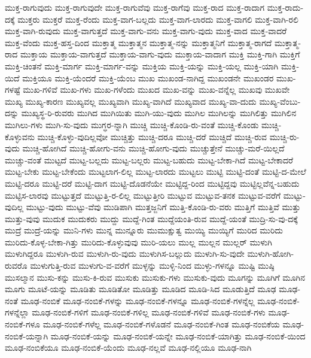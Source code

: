 {ಮುಕ್ತ-ರಾಗುವುದು
ಮುಕ್ತ-ರಾಗುವುದೇ
ಮುಕ್ತ-ರಾಗುವೆವು
ಮುಕ್ತ-ರಾಗೆವು
ಮುಕ್ತ-ರಾದ
ಮುಕ್ತ-ರಾದಾಗ
ಮುಕ್ತ-ರಾದು-ದಕ್ಕೆ
ಮುಕ್ತರು
ಮುಕ್ತರೆ
ಮುಕ್ತ-ರೆಂದು
ಮುಕ್ತ-ವಾಗ-ಬಲ್ಲದು
ಮುಕ್ತ-ವಾಗ-ಲಾರದು
ಮುಕ್ತ-ವಾಗಲಿ
ಮುಕ್ತ-ವಾಗಿ-ರಲಿ
ಮುಕ್ತ-ವಾಗಿ-ರುವುದು
ಮುಕ್ತ-ವಾಗುತ್ತದೆ
ಮುಕ್ತ-ವಾಗು-ವನು
ಮುಕ್ತ-ವಾಗು-ವುದು
ಮುಕ್ತ-ವಾದ
ಮುಕ್ತ-ವಾದರೆ
ಮುಕ್ತ-ವೆಂದು
ಮುಕ್ತ-ಹಸ್ತ-ದಿಂದ
ಮುಕ್ತಾತ್ಮ
ಮುಕ್ತಾತ್ಮನ
ಮುಕ್ತಾತ್ಮ-ನನ್ನು
ಮುಕ್ತಾತ್ಮನಿಗೆ
ಮುಕ್ತಾತ್ಮ-ರಾಗದೆ
ಮುಕ್ತಾತ್ಮ-ರಾದ
ಮುಕ್ತಾಯ
ಮುಕ್ತಾಯ-ವಾಗುತ್ತದೆ
ಮುಕ್ತಾಯ-ವಾಗು-ವುದು
ಮುಕ್ತಾಯ-ವಾದಾಗ
ಮುಕ್ತಿ
ಮುಕ್ತಿ-ಗಾಗಿ
ಮುಕ್ತಿಗೆ
ಮುಕ್ತಿ-ಚಿಂತನೆ
ಮುಕ್ತಿ-ಮಾರ್ಗ
ಮುಕ್ತಿ-ಮಾರ್ಗ-ವನ್ನು
ಮುಕ್ತಿಯ
ಮುಕ್ತಿ-ಯನ್ನು
ಮುಕ್ತಿ-ಯಲ್ಲ
ಮುಕ್ತಿ-ಯಾಗಿ
ಮುಕ್ತಿ-ಯಿದೆ
ಮುಕ್ತಿಯೂ
ಮುಕ್ತಿ-ಯೆಂದರೆ
ಮುಕ್ತಿ-ಯೆಂಬ
ಮುಖ
ಮುಖಂಡ-ನಾಗಿದ್ದ
ಮುಖಂಡನೇ
ಮುಖಂಡರ
ಮುಖ-ಗಳಷ್ಟೆ
ಮುಖ-ಗಳಿವೆ
ಮುಖ-ಗಳು
ಮುಖ-ಗಳೆಂದು
ಮುಖದ
ಮುಖ-ವನ್ನು
ಮುಖ-ವನ್ನೆಲ್ಲ
ಮುಖವು
ಮುಖವೇ
ಮುಖ್ಯ
ಮುಖ್ಯ-ಕಾರಣ
ಮುಖ್ಯವಲ್ಲ
ಮುಖ್ಯವಾಗಿ
ಮುಖ್ಯ-ವಾಗಿದೆ
ಮುಖ್ಯವಾದ
ಮುಖ್ಯ-ವಾ-ದುದು
ಮುಖ್ಯ-ವೆಂಬು-ದನ್ನು
ಮುಖ್ಯಸ್ಥ-ರಿ-ರುವರು
ಮುಗಿದ
ಮುಗಿಯಿತು
ಮುಗಿ-ಯು-ವುದು
ಮುಗಿಲ
ಮುಗಿಲನ್ನು
ಮುಗಿಲಿತ್ತು
ಮುಗಿಲಿನ
ಮುಗಿಲು-ಗಳು
ಮುಗಿ-ಸು-ವುದು
ಮುಗ್ಧರ-ನ್ನಾಗಿ
ಮುಚ್ಚಿ
ಮುಚ್ಚಿ-ಕೊಂಡಿ-ರು-ವಂತೆ
ಮುಚ್ಚಿ-ಕೊಂಡು
ಮುಚ್ಚಿ-ಕೊಳ್ಳುವನು
ಮುಚ್ಚಿ-ಕೊಳ್ಳು-ವುದಿಲ್ಲವೋ
ಮುಚ್ಚಿತ್ತು
ಮುಚ್ಚಿ-ದರೂ
ಮುಚ್ಚಿ-ದರೆ
ಮುಚ್ಚಿದೆ
ಮುಚ್ಚಿ-ರುವ
ಮುಚ್ಚಿ-ರು-ವುದು
ಮುಚ್ಚಿ-ಹೋಗಿದೆ
ಮುಚ್ಚಿ-ಹೋಗು-ವನು
ಮುಚ್ಚಿ-ಹೋಗು-ವುದು
ಮುಚ್ಚುತ್ತೇನೆ
ಮುಚ್ಚು-ಮರೆ-ಯಿಲ್ಲದೆ
ಮುಚ್ಚು-ವಂತೆ
ಮುಟ್ಟದೆ
ಮುಟ್ಟ-ಬಲ್ಲದು
ಮುಟ್ಟ-ಬಲ್ಲರು
ಮುಟ್ಟ-ಬಹುದು
ಮುಟ್ಟ-ಬೇಕಾ-ಗಿದೆ
ಮುಟ್ಟ-ಬೇಕಾದರೆ
ಮುಟ್ಟ-ಬೇಕು
ಮುಟ್ಟ-ಬೇಕೆಂದು
ಮುಟ್ಟಲಾಗ-ಲಿಲ್ಲ
ಮುಟ್ಟ-ಲಾರದು
ಮುಟ್ಟಲು
ಮುಟ್ಟಿ
ಮುಟ್ಟಿ-ದಂತೆ
ಮುಟ್ಟಿ-ದ-ಮೇಲೆ
ಮುಟ್ಟಿ-ದರೂ
ಮುಟ್ಟಿ-ದರೆ
ಮುಟ್ಟಿ-ದಾಗ
ಮುಟ್ಟಿ-ದೊಡನೆಯೇ
ಮುಟ್ಟಿದ್ದ-ರಿಂದ
ಮುಟ್ಟಿದ್ದವು
ಮುಟ್ಟಿಲ್ಲವೆನ್ನ-ಬಹುದು
ಮುಟ್ಟಿಸ-ಲಾರವು
ಮುಟ್ಟುತ್ತದೆ
ಮುಟ್ಟುತ್ತಿ-ರ-ಲಿಲ್ಲ
ಮುಟ್ಟುತ್ತೀರಿ
ಮುಟ್ಟುವ
ಮುಟ್ಟುವ-ತನಕ
ಮುಟ್ಟುವ-ವರೆಗೆ
ಮುಟ್ಟು-ವುದಿಲ್ಲ
ಮುಟ್ಟು-ವುದು
ಮುಟ್ಟು-ವೆವು
ಮುಡಿಪಾಗಿ
ಮುತ್ತಜ್ಜನಿಗೆ
ಮುತ್ತಿ-ಕೊಂಡಿ-ರು-ವರು
ಮುತ್ತಿಗೆ
ಮುತ್ತಿವೆ
ಮುತ್ತು
ಮುತ್ತು-ವುವು
ಮುದುಕ
ಮುದುಕರು
ಮುದ್ದು
ಮುದ್ದೆ-ಗಿಂತ
ಮುದ್ದೆಯಂತಿ-ರುವ
ಮುದ್ದೆ-ಯಂತೆ
ಮುದ್ರಿ-ಸು-ವು-ದಕ್ಕೆ
ಮುದ್ರೆ
ಮುದ್ರೆ-ಯನ್ನು
ಮುನಿ-ಗಳು
ಮುನ್ನ
ಮುನ್ನೂರು
ಮುಮುಕ್ಷುತ್ವ
ಮುಯ್ಯಿ
ಮುಯ್ಯಿಗೆ
ಮುರಿದ
ಮುರಿದು
ಮುರಿದು-ಕೊಳ್ಳ-ಬೇಕಾ-ಗಿತ್ತು
ಮುರಿದು-ಕೊಳ್ಳುವುವು
ಮುರಿ-ಯಲು
ಮುಲ್ಲ
ಮುಲ್ಲನ
ಮುಲ್ಲರ್
ಮುಳುಗಿ
ಮುಳುಗಿದ್ದರೂ
ಮುಳುಗಿ-ರುವ
ಮುಳುಗಿ-ರು-ವುದು
ಮುಳುಗಿಸ-ಬಲ್ಲುದು
ಮುಳುಗಿ-ಸು-ವುದೇ
ಮುಳುಗಿ-ಹೋಗಿ-ರುವರೊ
ಮುಳುಗುತ್ತಿ-ರುವ
ಮುಳುಗು-ವ-ವರೆಗೆ
ಮುಳ್ಳನ್ನು
ಮುಳ್ಳಿ-ನಿಂದ
ಮುಳ್ಳು-ಗಳನ್ನೂ
ಮುಷ್ಟಿ
ಮುಷ್ಠಿ
ಮುಸಲ್ಮಾನ
ಮುಸು-ಕನ್ನು
ಮುಸು-ಕಿ-ರುವ
ಮುಸುಕು
ಮುಸುಕು-ಗಳು
ಮುಸುಕು-ವುದು
ಮೂಗನ್ನು
ಮೂಗಿಗೆ
ಮೂಗಿನ
ಮೂಗು
ಮೂಟೆ-ಯನ್ನು
ಮೂಡಿತು
ಮೂಡಿತೋ
ಮೂಡಿತ್ತು
ಮೂಡಿದ
ಮೂಡಿ-ಸಿದ
ಮೂಡುತ್ತಿದೆ
ಮೂಢ
ಮೂಢ-ನಂತೆ
ಮೂಢ-ನಂಬಿಕೆ
ಮೂಢ-ನಂಬಿಕೆ-ಗಳನ್ನು
ಮೂಢ-ನಂಬಿಕೆ-ಗಳನ್ನೂ
ಮೂಢ-ನಂಬಿಕೆ-ಗಳನ್ನೆಲ್ಲ
ಮೂಢ-ನಂಬಿಕೆ-ಗಳನ್ನೆಲ್ಲಾ
ಮೂಢ-ನಂಬಿಕೆ-ಗಳಿಗೆ
ಮೂಢ-ನಂಬಿಕೆ-ಗಳಿಲ್ಲ
ಮೂಢ-ನಂಬಿಕೆ-ಗಳಿವೆ
ಮೂಢ-ನಂಬಿಕೆ-ಗಳು
ಮೂಢ-ನಂಬಿಕೆ-ಗಳೂ
ಮೂಢ-ನಂಬಿಕೆ-ಗಳೆಲ್ಲ
ಮೂಢ-ನಂಬಿಕೆ-ಗಳೊಡನೆ
ಮೂಢ-ನಂಬಿಕೆ-ಗಿಂತ
ಮೂಢ-ನಂಬಿಕೆಯ
ಮೂಢ-ನಂಬಿಕೆ-ಯನ್ನಾಗಿ
ಮೂಢ-ನಂಬಿಕೆ-ಯನ್ನು
ಮೂಢ-ನಂಬಿಕೆ-ಯನ್ನೇ
ಮೂಢ-ನಂಬಿಕೆ-ಯಾಗಿತ್ತು
ಮೂಢ-ನಂಬಿಕೆ-ಯಿಂದ
ಮೂಢ-ನಂಬಿಕೆಯೂ
ಮೂಢ-ನಂಬಿಕೆ-ಯೆಂದು
ಮೂಢ-ನಲ್ಲವೆ
ಮೂಢ-ನಲ್ಲಿಯೂ
ಮೂಢ-ನಾಗಿ
}
